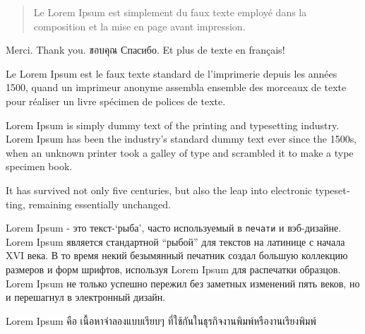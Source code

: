 \documentclass[12pt]{article}
\begin{document}
\begin{abstract}
Le Lorem Ipsum est simplement du faux texte employé dans la composition et la mise en page avant impression.
\end{abstract}
 
Merci. \foreignlanguage{english}{Thank you.} \foreignlanguage{thai}{ขอบคุณ} \foreignlanguage{russian}{Спасибо.} Et plus de
texte en français!
 
Le Lorem Ipsum est le faux texte standard de l'imprimerie depuis les années 1500, quand un imprimeur anonyme assembla ensemble des morceaux de texte pour réaliser un livre spécimen de polices de texte.

\begin{otherlanguage}{english}
Lorem Ipsum is simply dummy text of the printing and typesetting industry. Lorem Ipsum has been the industry’s standard dummy text ever since the 1500s, when an unknown printer took a galley of type and scrambled it to make a type specimen book. 

It has survived not only five centuries, but also the leap into electronic typesetting, remaining essentially unchanged. \end{otherlanguage}
 
\begin{otherlanguage}{russian}
Lorem Ipsum - это текст-`\textsf{рыба}', часто используемый в \texttt{печати} и вэб-дизайне. Lorem Ipsum является стандартной ``рыбой'' для текстов на латинице с начала XVI века. В то время некий безымянный печатник создал большую коллекцию размеров и форм шрифтов, используя Lorem Ipsum для распечатки образцов. Lorem Ipsum не только успешно пережил без заметных изменений пять веков, но и перешагнул в электронный дизайн. \end{otherlanguage}
 
\begin{otherlanguage}{thai}
\foreignlanguage{english}{Lorem Ipsum} คือ เนื้อหาจำลองแบบเรียบๆ ที่ใช้กันในธุรกิจงานพิมพ์หรืองานเรียงพิมพ์
\end{otherlanguage}
\end{document}
